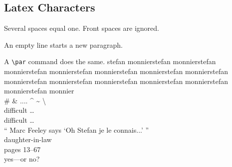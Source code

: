 \documentclass[11pt,oneside,a4paper]{article}
\begin{document}
      \subsection{Latex Characters}


            \indent Several spaces    equal one.
                  Front spaces are ignored.

            An empty line starts a new paragraph. \par
            A \verb|\par| command does the same.
            stefan monnierstefan monnierstefan monnierstefan monnierstefan monnierstefan monnierstefan monnierstefan monnierstefan monnierstefan monnierstefan monnierstefan monnierstefan monnierstefan monnier \\

            \# \& .... \^{} \~{} \textbackslash \\

            difficult \ldots \\
            dif{}f{}icult \ldots \\


            `` Marc Feeley says `Oh Stefan je le connais...' ''\\

            daughter-in-law\\        
            pages 13--67 \\
            yes---or no?
\end{document}
